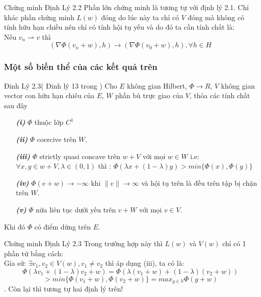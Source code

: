 \documentclass[11pt]{beamer}
\numberwithin{equation}{section}
\theoremstyle{plain}
\theoremstyle{definition}
\theoremstyle{remark}
\begin{document}
\begin{frame}
\begin{block}{Chứng minh Định Lý 2.2}
Phần lớn chứng minh là tương tự với định lý 2.1. Chỉ khác phần chứng minh $L(w)$ đóng do lúc này ta chỉ có $V$ đóng mà không có tính hữu hạn chiều nên chỉ có tính hội tụ yếu và do đó ta cần tính chất là:\\
 Nếu $v_n \rightharpoonup v$ thì \[(\nabla \Phi(v_n+w), h ) \rightarrow (\nabla \Phi(v_0+w), h) ,\forall h \in H\] 

\end{block}
\end{frame}




\begin{frame}
\frametitle{Một số biến thể của các kết quả trên}
\begin{block}{Đinh Lý 2.3( Đinh lý 13 trong \cite{YJMM})}
Cho $E$ không gian Hilbert, $\Phi \rightarrow R$, $V$ không gian  vector con hữu hạn chiêu của $E$, $W$ phần bù trực giao của $V$, thỏa các tính chất sau đây
\begin{itemize}
\item[\textbf{\textit{(i)}}] $\Phi$ thuộc lớp $C^1$
\item[\textbf{\textit{(ii)}}]  $\Phi$ coercive trên $W$.
\item[\textbf{\textit{(iii)}}]  $\Phi$ strictly quasi concave trên $w+V$ với mọi $w\in W$ i.e:\\
$\forall x,y \in w+V , \lambda \in (0,1)$ thì : $\Phi(\lambda x+(1-\lambda)y)> min \{\Phi(x),\Phi(y)\}$
\item[\textbf{\textit{(iv)}}] $\Phi(v+w) \rightarrow -\infty$ khi $\|v\| \rightarrow \infty$ và hội tụ trên là đều trên tập bị chặn trên $W$.
\item[\textbf{\textit{(v)}}]  $\Phi$ nữa liên tục dưới yếu trên $v+W$ với mọi $v \in V$.
\end{itemize}
Khi đó $\Phi$ có điểm dừng trên $E$.
\end{block}
\end{frame}


\begin{frame}
\begin{block}{Chứng minh Định Lý 2.3}
Trong trường hợp này thì $L(w)$ và $V(w)$ chỉ có 1 phần tử bằng cách:\\
Gỉa sử: $\exists v_1,v_2\in V(w),v_1\neq v_2$ thì áp dụng (iii), ta có là:
$$\Phi(\lambda v_1+(1-\lambda)v_2+w)=\Phi(\lambda (v_1+w)+(1-\lambda)(v_2+w))$$
$$> min \{\Phi(v_1+w),\Phi(v_2+w)\}=max_{g\in V}\Phi(g+w)$$.
Còn lại thì tương tự hai định lý trên!
\end{block}
\end{frame}
\end{document}
